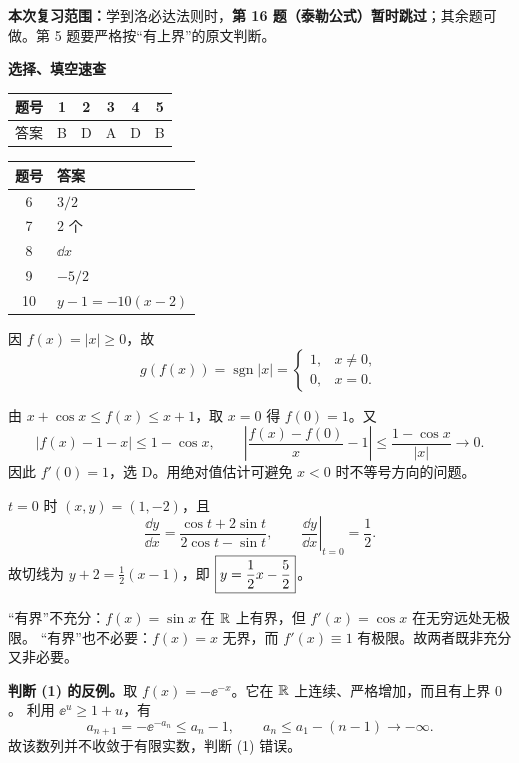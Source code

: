 

\textbf{本次复习范围：}学到洛必达法则时，\textbf{第 16 题（泰勒公式）暂时跳过}；其余题可做。第 5 题要严格按“有上界”的原文判断。

\textbf{选择、填空速查}
\begin{center}
\begin{tabular}{c*{5}{c}}
\toprule 题号 & 1 & 2 & 3 & 4 & 5\\\midrule
答案 & B & D & A & D & B\\\bottomrule
\end{tabular}\qquad
\begin{tabular}{cl}
\toprule 题号 & 答案\\\midrule
6 & $3/2$\\
7 & $2$ 个\\
8 & $\dd x$\\
9 & $-5/2$\\
10 & $y-1=-10(x-2)$\\\bottomrule
\end{tabular}
\end{center}

因 $f(x)=|x|\ge0$，故
\[
g(f(x))=\operatorname{sgn}|x|=\begin{cases}1,&x\ne0,\\0,&x=0.\end{cases}
\]

由 $x+\cos x\le f(x)\le x+1$，取 $x=0$ 得 $f(0)=1$。又
\[
|f(x)-1-x|\le1-\cos x,
\qquad
\left|\frac{f(x)-f(0)}x-1\right|\le\frac{1-\cos x}{|x|}\longrightarrow0.
\]
因此 $f'(0)=1$，选 D。用绝对值估计可避免 $x<0$ 时不等号方向的问题。

$t=0$ 时 $(x,y)=(1,-2)$，且
\[
\frac{\dd y}{\dd x}=\frac{\cos t+2\sin t}{2\cos t-\sin t},\qquad
\left.\frac{\dd y}{\dd x}\right|_{t=0}=\frac12.
\]
故切线为 $y+2=\frac12(x-1)$，即 $\boxed{y=\frac12x-\frac52}$。

“有界”不充分：$f(x)=\sin x$ 在 $\mathbb R$ 上有界，但 $f'(x)=\cos x$ 在无穷远处无极限。
“有界”也不必要：$f(x)=x$ 无界，而 $f'(x)\equiv1$ 有极限。故两者既非充分又非必要。

\newpage
{}
\textbf{判断 (1) 的反例。}取 $f(x)=-\ee^{-x}$。它在 $\mathbb R$ 上连续、严格增加，而且有上界 $0$。
利用 $\ee^u\ge1+u$，有
\[
a_{n+1}=-\ee^{-a_n}\le a_n-1,
\qquad a_n\le a_1-(n-1)\longrightarrow-\infty.
\]
故该数列并不收敛于有限实数，判断 (1) 错误。

